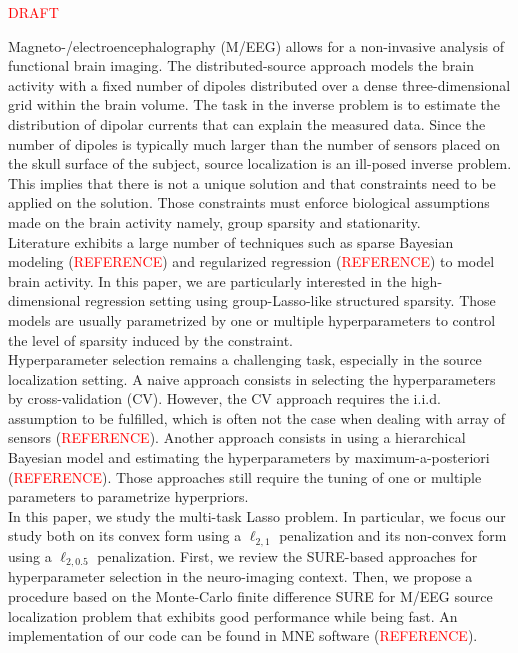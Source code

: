 \textcolor{red}{DRAFT}

Magneto-/electroencephalography (M/EEG) allows for a non-invasive analysis of
functional brain imaging. The distributed-source approach models the brain activity
with a fixed number of dipoles distributed over a dense three-dimensional 
grid within the brain volume. The task in the inverse problem  is to estimate the 
distribution of dipolar currents that can explain the measured data. Since the 
number of dipoles is typically much larger than the number of sensors placed on 
the skull surface of the subject, source localization is an ill-posed inverse problem. 
This implies that there is not a unique solution and that constraints need to be 
applied on the solution. Those constraints must enforce biological assumptions 
made on the brain activity namely, group sparsity and stationarity.
\\
Literature exhibits a large number of techniques such as sparse Bayesian modeling 
(\textcolor{red}{REFERENCE}) and regularized regression (\textcolor{red}{REFERENCE}) 
to model brain activity. In this paper, we are particularly interested in the 
high-dimensional regression setting using group-Lasso-like structured sparsity. 
Those models are usually parametrized by one or multiple hyperparameters to 
control the level of sparsity induced by the constraint.
\\
Hyperparameter selection remains a challenging task, especially in the source 
localization setting. A naive approach consists in selecting the hyperparameters 
by cross-validation (CV). However, the CV approach requires the i.i.d. assumption 
to be fulfilled, which is often not the case when dealing with array of sensors 
(\textcolor{red}{REFERENCE}). Another approach consists in using a hierarchical 
Bayesian model and estimating the hyperparameters by maximum-a-posteriori 
(\textcolor{red}{REFERENCE}). Those approaches still require the tuning of one
or multiple parameters to parametrize hyperpriors.
\\
In this paper, we study the multi-task Lasso problem. In particular, we focus 
our study both on its convex form using a $\ell_{2, 1}$ penalization and its non-convex 
form using a $\ell_{2, 0.5}$ penalization. First, we review the SURE-based approaches
for hyperparameter selection in the neuro-imaging context. Then, we propose a 
procedure based on the Monte-Carlo finite difference SURE \cite{Deledalle_Vaiter_Fadili_Peyre14}
for M/EEG source localization problem that exhibits good performance while being
fast. An implementation of our code can be found in MNE software (\textcolor{red}{REFERENCE}).
